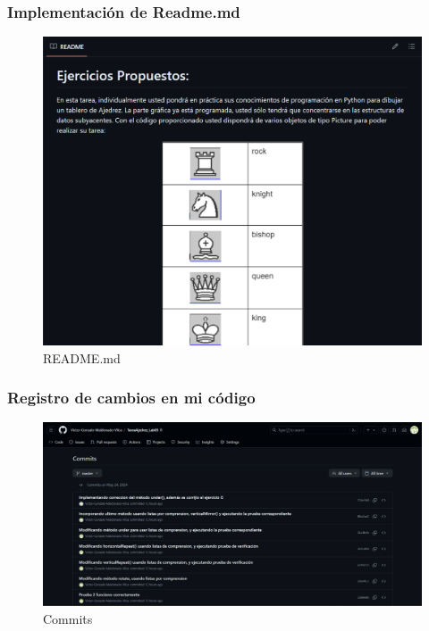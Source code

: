 \documentclass{article}
\begin{document}
  
  \subsubsection{Implementación de Readme.md}
  \begin{figure}[H]
    \centering
    \includegraphics[width=1\textwidth, keepaspectratio]{img/readme.png}
    \caption{README.md}
  \end{figure}
  \newpage
  

	\subsubsection{Registro de cambios en mi código}
  \begin{figure}[H]
    \centering
    \includegraphics[width=1\textwidth, keepaspectratio]{img/commits.png}
    \caption{Commits}
  \end{figure}
	
\end{document}
